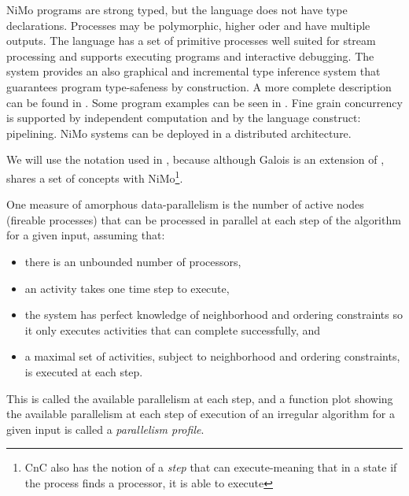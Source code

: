 \documentclass{article}                     \usepackage{graphics}
\begin{document}
  NiMo programs are strong typed,  but the language does not have type declarations. Processes may be  polymorphic, higher oder and have multiple outputs. The language has a set of primitive processes well suited for stream processing and supports  executing  programs and interactive debugging. The system provides an also graphical and incremental type inference system that guarantees program type-safeness by construction. A more complete description can be found in \cite{art-revista}. Some program examples can be seen in \cite{nimo-home}.  Fine grain  concurrency is supported by independent computation and  by the  language construct: pipelining. NiMo systems can be deployed in a distributed architecture.
 




 






























We will use the notation used in \cite{galois}, because although Galois is an extension of , shares a set of concepts with NiMo\footnote{CnC also has the notion of a \textit{step} that can execute-meaning that in a state   if the process  finds a processor, it is able to execute}.

 One measure of amorphous data-parallelism is
the number of active nodes (fireable processes)  that can be processed in parallel at each
step of the algorithm for a given input, assuming that:
\begin{itemize}
\item  there is an unbounded number of processors, 
\item  an activity takes one time step to execute, 
\item  the system has perfect knowledge of neighborhood and ordering constraints so it only executes activities that can
complete successfully, and 
\item a maximal set of activities, subject to neighborhood and ordering constraints, is executed at each step.
\end{itemize}
This is called the available parallelism at each step, and a function plot showing the available parallelism at each step of execution of
an irregular algorithm for a given input is called a \textit{parallelism profile}.
\end{document}
